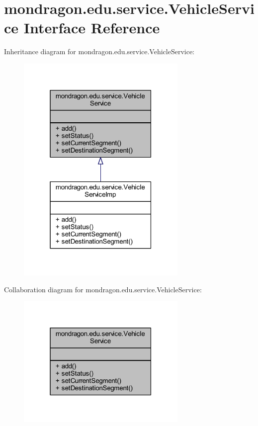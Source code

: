 \hypertarget{interfacemondragon_1_1edu_1_1service_1_1_vehicle_service}{}\section{mondragon.\+edu.\+service.\+Vehicle\+Service Interface Reference}
\label{interfacemondragon_1_1edu_1_1service_1_1_vehicle_service}


Inheritance diagram for mondragon.\+edu.\+service.\+Vehicle\+Service\+:\nopagebreak
\begin{figure}[H]
\begin{center}
\leavevmode
\includegraphics[width=232pt]{interfacemondragon_1_1edu_1_1service_1_1_vehicle_service__inherit__graph}
\end{center}
\end{figure}


Collaboration diagram for mondragon.\+edu.\+service.\+Vehicle\+Service\+:\nopagebreak
\begin{figure}[H]
\begin{center}
\leavevmode
\includegraphics[width=232pt]{interfacemondragon_1_1edu_1_1service_1_1_vehicle_service__coll__graph}
\end{center}
\end{figure}
